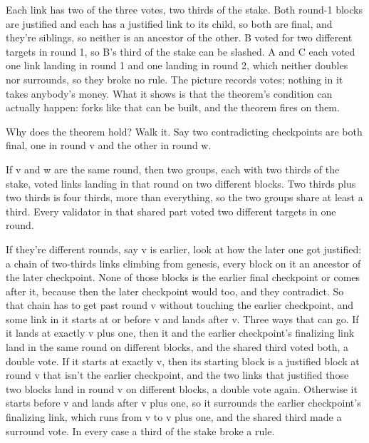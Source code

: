 \documentclass[11pt,twoside]{article}
\theoremstyle{thielethm}
\theoremstyle{thieledef}
\theoremstyle{thieledef}
\theoremstyle{thieledef}
\theoremstyle{thielethm}
\theoremstyle{thieleobs}
\theoremstyle{thielethm}
\begin{document}
\begin{center}
\end{center}

Each link has two of the three votes, two thirds of the stake. Both round-1 blocks are justified and each has a justified link to its child, so both are final, and they're siblings, so neither is an ancestor of the other. B voted for two different targets in round 1, so B's third of the stake can be slashed. A and C each voted one link landing in round 1 and one landing in round 2, which neither doubles nor surrounds, so they broke no rule. The picture records votes; nothing in it takes anybody's money. What it shows is that the theorem's condition can actually happen: forks like that can be built, and the theorem fires on them.

Why does the theorem hold? Walk it. Say two contradicting checkpoints are both final, one in round v and the other in round w.

If v and w are the same round, then two groups, each with two thirds of the stake, voted links landing in that round on two different blocks. Two thirds plus two thirds is four thirds, more than everything, so the two groups share at least a third. Every validator in that shared part voted two different targets in one round.

If they're different rounds, say v is earlier, look at how the later one got justified: a chain of two-thirds links climbing from genesis, every block on it an ancestor of the later checkpoint. None of those blocks is the earlier final checkpoint or comes after it, because then the later checkpoint would too, and they contradict. So that chain has to get past round v without touching the earlier checkpoint, and some link in it starts at or before v and lands after v. Three ways that can go. If it lands at exactly v plus one, then it and the earlier checkpoint's finalizing link land in the same round on different blocks, and the shared third voted both, a double vote. If it starts at exactly v, then its starting block is a justified block at round v that isn't the earlier checkpoint, and the two links that justified those two blocks land in round v on different blocks, a double vote again. Otherwise it starts before v and lands after v plus one, so it surrounds the earlier checkpoint's finalizing link, which runs from v to v plus one, and the shared third made a surround vote. In every case a third of the stake broke a rule.
\end{document}
